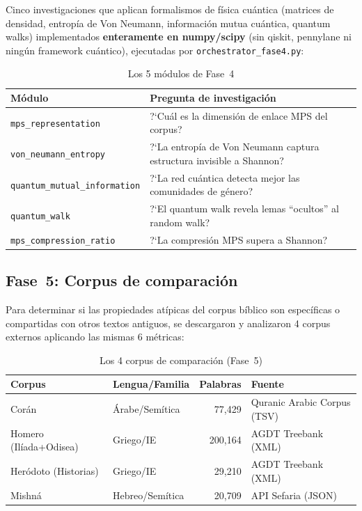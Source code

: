 \documentclass[12pt,a4paper]{article}
\begin{document}
Cinco investigaciones que aplican formalismos de f\'isica cu\'antica (matrices de densidad,
entrop\'ia de Von Neumann, informaci\'on mutua cu\'antica, quantum walks) implementados
\textbf{enteramente en numpy/scipy} (sin qiskit, pennylane ni ning\'un framework cu\'antico),
ejecutadas por \texttt{orchestrator\_fase4.py}:

\begin{table}[H]
\centering
\caption{Los 5 m\'odulos de Fase~4}
\begin{tabular}{lp{9cm}}
\toprule
\textbf{M\'odulo} & \textbf{Pregunta de investigaci\'on} \\
\midrule
\texttt{mps\_representation}      & ?`Cu\'al es la dimensi\'on de enlace MPS del corpus? \\
\texttt{von\_neumann\_entropy}    & ?`La entrop\'ia de Von Neumann captura estructura invisible a Shannon? \\
\texttt{quantum\_mutual\_information} & ?`La red cu\'antica detecta mejor las comunidades de g\'enero? \\
\texttt{quantum\_walk}            & ?`El quantum walk revela lemas ``ocultos'' al random walk? \\
\texttt{mps\_compression\_ratio}  & ?`La compresi\'on MPS supera a Shannon? \\
\bottomrule
\end{tabular}
\end{table}

\subsection{Fase~5: Corpus de comparaci\'on}

Para determinar si las propiedades at\'ipicas del corpus b\'iblico son espec\'ificas
o compartidas con otros textos antiguos, se descargaron y analizaron 4 corpus externos
aplicando las mismas 6 m\'etricas:

\begin{table}[H]
\centering
\caption{Los 4 corpus de comparaci\'on (Fase~5)}
\begin{tabular}{lp{3cm}rp{5cm}}
\toprule
\textbf{Corpus} & \textbf{Lengua/Familia} & \textbf{Palabras} & \textbf{Fuente} \\
\midrule
Cor\'an & \'Arabe/Sem\'itica & 77,429 & Quranic Arabic Corpus (TSV) \\
Homero (Il\'iada+Odisea) & Griego/IE & 200,164 & AGDT Treebank (XML) \\
Her\'odoto (Historias) & Griego/IE & 29,210 & AGDT Treebank (XML) \\
Mishn\'a & Hebreo/Sem\'itica & 20,709 & API Sefaria (JSON) \\
\bottomrule
\end{tabular}
\end{table}
\end{document}
